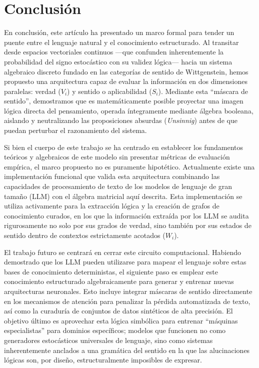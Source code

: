 \documentclass{article}
\begin{document}
\hypertarget{conclusiuxf3n}{%
\section{Conclusión}\label{conclusiuxf3n}}

En conclusión, este artículo ha presentado un marco formal para tender
un puente entre el lenguaje natural y el conocimiento estructurado. Al
transitar desde espacios vectoriales continuos ---que confunden
inherentemente la probabilidad del signo estocástico con su validez
lógica--- hacia un sistema algebraico discreto fundado en las categorías
de sentido de Wittgenstein, hemos propuesto una arquitectura capaz de
evaluar la información en dos dimensiones paralelas: verdad (\(V_i\)) y
sentido o aplicabilidad (\(S_i\)). Mediante esta ``máscara de sentido'',
demostramos que es matemáticamente posible proyectar una imagen lógica
directa del pensamiento, operada íntegramente mediante álgebra booleana,
aislando y neutralizando las proposiciones absurdas (\emph{Unsinnig})
antes de que puedan perturbar el razonamiento del sistema.

Si bien el cuerpo de este trabajo se ha centrado en establecer los
fundamentos teóricos y algebraicos de este modelo sin presentar métricas
de evaluación empírica, el marco propuesto no es puramente hipotético.
Actualmente existe una implementación funcional que valida esta
arquitectura combinando las capacidades de procesamiento de texto de los
modelos de lenguaje de gran tamaño (LLM) con el álgebra matricial aquí
descrita. Esta implementación se utiliza activamente para la extracción
lógica y la creación de grafos de conocimiento curados, en los que la
información extraída por los LLM se audita rigurosamente no solo por sus
grados de verdad, sino también por sus estados de sentido dentro de
contextos estrictamente acotados (\(W_i\)).

El trabajo futuro se centrará en cerrar este circuito computacional.
Habiendo demostrado que los LLM pueden utilizarse para mapear el
lenguaje sobre estas bases de conocimiento deterministas, el siguiente
paso es emplear este conocimiento estructurado algebraicamente para
generar y entrenar nuevas arquitecturas neuronales. Esto incluye
integrar máscaras de sentido directamente en los mecanismos de atención
para penalizar la pérdida automatizada de texto, así como la curaduría
de conjuntos de datos sintéticos de alta precisión. El objetivo último
es aprovechar esta lógica simbólica para entrenar ``máquinas
especialistas'' para dominios específicos; modelos que funcionen no como
generadores estocásticos universales de lenguaje, sino como sistemas
inherentemente anclados a una gramática del sentido en la que las
alucinaciones lógicas son, por diseño, estructuralmente imposibles de
expresar.
\end{document}
